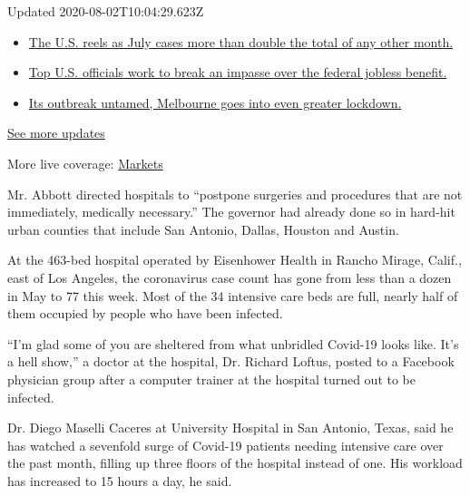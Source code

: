 Updated 2020-08-02T10:04:29.623Z

\begin{itemize}
\tightlist
\item
  \href{https://www.nytimes.com/2020/08/01/world/coronavirus-covid-19.html?action=click\&pgtype=Article\&state=default\&region=MAIN_CONTENT_1\&context=storylines_live_updates\#link-34047410}{The
  U.S. reels as July cases more than double the total of any other
  month.}
\item
  \href{https://www.nytimes.com/2020/08/01/world/coronavirus-covid-19.html?action=click\&pgtype=Article\&state=default\&region=MAIN_CONTENT_1\&context=storylines_live_updates\#link-780ec966}{Top
  U.S. officials work to break an impasse over the federal jobless
  benefit.}
\item
  \href{https://www.nytimes.com/2020/08/01/world/coronavirus-covid-19.html?action=click\&pgtype=Article\&state=default\&region=MAIN_CONTENT_1\&context=storylines_live_updates\#link-2bc8948}{Its
  outbreak untamed, Melbourne goes into even greater lockdown.}
\end{itemize}

\href{https://www.nytimes.com/2020/08/01/world/coronavirus-covid-19.html?action=click\&pgtype=Article\&state=default\&region=MAIN_CONTENT_1\&context=storylines_live_updates}{See
more updates}

More live coverage:
\href{https://www.nytimes.com/live/2020/07/31/business/stock-market-today-coronavirus?action=click\&pgtype=Article\&state=default\&region=MAIN_CONTENT_1\&context=storylines_live_updates}{Markets}

Mr. Abbott directed hospitals to ``postpone surgeries and procedures
that are not immediately, medically necessary.'' The governor had
already done so in hard-hit urban counties that include San Antonio,
Dallas, Houston and Austin.

At the 463-bed hospital operated by Eisenhower Health in Rancho Mirage,
Calif., east of Los Angeles, the coronavirus case count has gone from
less than a dozen in May to 77 this week. Most of the 34 intensive care
beds are full, nearly half of them occupied by people who have been
infected.

``I'm glad some of you are sheltered from what unbridled Covid-19 looks
like. It's a hell show,'' a doctor at the hospital, Dr. Richard Loftus,
posted to a Facebook physician group after a computer trainer at the
hospital turned out to be infected.

Dr. Diego Maselli Caceres at University Hospital in San Antonio, Texas,
said he has watched a sevenfold surge of Covid-19 patients needing
intensive care over the past month, filling up three floors of the
hospital instead of one. His workload has increased to 15 hours a day,
he said.

